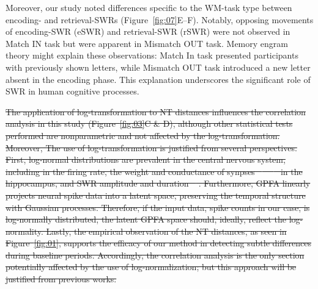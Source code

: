 \documentclass[preprint,review,12pt]{elsarticle}%
\providecommand{\DIFdeltex}[1]{{\protect\color{red}\sout{#1}}}                      %
\providecommand{\DIFdelbegin}{} %
\providecommand{\DIFdel}[1]{\texorpdfstring{\DIFdeltex{#1}}{}} %
\newcommand{\DIFscaledelfig}{0.5}
\newlength{\DIFdelgraphicswidth} %
\newlength{\DIFdelgraphicsheight} %
\newcommand{\DIFdelincludegraphics}[2][]{%
\sbox{\DIFdelgraphicsbox}{\DIFOincludegraphics[#1]{#2}}%
\settoboxwidth{\DIFdelgraphicswidth}{\DIFdelgraphicsbox} %
\settoboxtotalheight{\DIFdelgraphicsheight}{\DIFdelgraphicsbox} %
\scalebox{\DIFscaledelfig}{%
\parbox[b]{\DIFdelgraphicswidth}{\usebox{\DIFdelgraphicsbox}\\[-\baselineskip] \rule{\DIFdelgraphicswidth}{0em}}\llap{\resizebox{\DIFdelgraphicswidth}{\DIFdelgraphicsheight}{%
\setlength{\unitlength}{\DIFdelgraphicswidth}%
\begin{picture}(1,1)%
\thicklines\linethickness{2pt} %
{\color[rgb]{1,0,0}\put(0,0){\framebox(1,1){}}}%
{\color[rgb]{1,0,0}\put(0,0){\line( 1,1){1}}}%
{\color[rgb]{1,0,0}\put(0,1){\line(1,-1){1}}}%
\end{picture}%
}\hspace*{3pt}}} %
} %
\DeclareRobustCommand{\DIFdelbegin}{\DIFOdelbegin \let\includegraphics\DIFdelincludegraphics} %
\begin{document}
Moreover, our study noted differences specific to the WM-task type between encoding- and retrieval-SWRs (Figure~\ref{fig:07}E--F). Notably, opposing movements of encoding-SWR (eSWR) and retrieval-SWR (rSWR) were not observed in Match IN task but were apparent in Mismatch OUT task. Memory engram theory \cite{liu_optogenetic_2012} might explain these observations: Match In task presented participants with previously shown letters, while Mismatch OUT task introduced a new letter absent in the encoding phase. This explanation underscores the significant role of SWR in human cognitive processes.

\DIFdelbegin \DIFdel{The application of log-transformation to NT distances influences the correlation analysis in this study (Figure~\ref{fig:03}C \& D), although other statistical tests performed are nonparametric and not affected by the log-transformation. Moreover, The use of log-transformation is justified from several perspectives. First, log-normal distributions are prevalent in the central nervous system, including in the firing rate, the weight and conductance of synpses \mbox{%
\cite{buzsaki_log-dynamic_2014} }\hspace{0pt}%
\mbox{%
\cite{ikegaya_interpyramid_2013} }\hspace{0pt}%
in the hippocampus, and SWR amplitude and duration \mbox{%
\cite{liu_consensus_2022}}\hspace{0pt}%
. Furthermore, GPFA linearly projects neural spike data into a latent space, preserving the temporal structure with Gaussian processes. Therefore, if the input data, spike counts in our case, is log-normally distributed, the latent GPFA space should, ideally, reflect the log-normality. Lastly, the empirical observation of the NT distances, as seen in Figure~\ref{fig:01}, supports the efficacy of our method in detecting subtle differences during baseline periods. Accordingly, the correlation analysis is the only section potentially affected by the use of log-normalization; but this approach will be justified from previous works.
}
\end{document}
